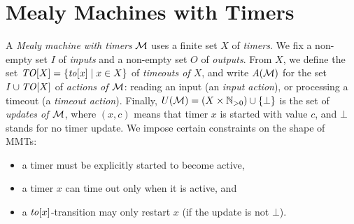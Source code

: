 %


\chapter{Mealy Machines with Timers}

A \emph{Mealy machine with timers} \(\mathcal{M}\) uses a finite set $X$ of
\emph{timers}.  We fix a non-empty set \(I\) of \emph{inputs} and a non-empty
set \(O\) of \emph{outputs}.
From  
\(X\),  
we define the set
\(\mathit{TO}[X] = \{\mathit{to}[x] \mid x \in X\}\) of \emph{timeouts of \(X\)}, and
write \({A({\mathcal{M}})}\) for the set \(I \cup \mathit{TO}[X]\) of \emph{actions of
\(\mathcal{M}\)}: %
reading an input (an \emph{input action}),
or processing a timeout (a \emph{timeout action}).
Finally, \({U({\mathcal{M}})} = (X \times {\mathbb N}_{>0}) \cup \{\bot\}\) is the set of
\emph{updates of \(\mathcal{M}\)}, where $(x, c)$ means that timer $x$ is started with
value $c$, and $\bot$ stands for no timer update.
We impose certain
constraints on the shape of 
MMTs:
\begin{itemize}
  \item a timer must be explicitly started to become active,
  \item a timer \(x\) can time out only when it is active, and
  \item a \(\mathit{to}[x]\)-transition may only restart \(x\) (if the update is
not \(\bot\)).
\end{itemize}

